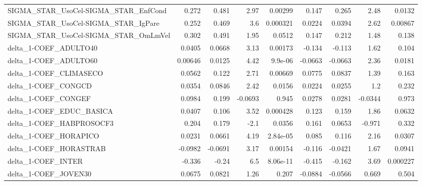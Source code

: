 \begin{tabular}{lrrrrrrrr}
SIGMA\_STAR\_UsoCel-SIGMA\_STAR\_EnfCond  &       0.272 &        0.481 &    2.97 &  0.00299 &      0.147 &       0.265 &         2.48 &        0.0132 \\
SIGMA\_STAR\_UsoCel-SIGMA\_STAR\_IgPare   &       0.252 &        0.469 &     3.6 & 0.000321 &     0.0224 &      0.0394 &         2.62 &       0.00867 \\
SIGMA\_STAR\_UsoCel-SIGMA\_STAR\_OmLmVel  &       0.302 &        0.491 &    1.95 &   0.0512 &      0.147 &       0.212 &         1.48 &         0.138 \\
delta\_1-COEF\_ADULTO40                 &      0.0405 &       0.0668 &    3.13 &  0.00173 &     -0.134 &      -0.113 &         1.62 &         0.104 \\
delta\_1-COEF\_ADULTO60                 &     0.00646 &       0.0125 &    4.42 &  9.9e-06 &    -0.0663 &     -0.0663 &         2.36 &        0.0181 \\
delta\_1-COEF\_CLIMASECO                &      0.0562 &        0.122 &    2.71 &  0.00669 &     0.0775 &      0.0837 &         1.39 &         0.163 \\
delta\_1-COEF\_CONGCD                   &      0.0354 &       0.0846 &    2.42 &   0.0156 &     0.0224 &      0.0255 &          1.2 &         0.232 \\
delta\_1-COEF\_CONGEF                   &      0.0984 &        0.199 & -0.0693 &    0.945 &     0.0278 &      0.0281 &      -0.0344 &         0.973 \\
delta\_1-COEF\_EDUC\_BASICA              &      0.0407 &        0.106 &    3.52 & 0.000428 &      0.123 &       0.159 &         1.86 &        0.0632 \\
delta\_1-COEF\_HABPROSOCF3              &       0.204 &        0.179 &    -2.1 &   0.0356 &      0.161 &      0.0653 &       -0.971 &         0.332 \\
delta\_1-COEF\_HORAPICO                 &      0.0231 &       0.0661 &    4.19 & 2.84e-05 &      0.085 &       0.116 &         2.16 &        0.0307 \\
delta\_1-COEF\_HORASTRAB                &     -0.0982 &      -0.0691 &    3.17 &  0.00154 &     -0.116 &     -0.0421 &         1.67 &        0.0941 \\
delta\_1-COEF\_INTER                    &      -0.336 &        -0.24 &     6.5 & 8.06e-11 &     -0.415 &      -0.162 &         3.69 &      0.000227 \\
delta\_1-COEF\_JOVEN30                  &      0.0675 &       0.0821 &    1.26 &    0.207 &    -0.0884 &     -0.0566 &        0.669 &         0.504 \\

\end{tabular}

